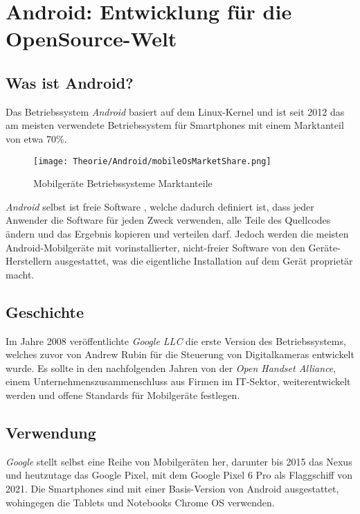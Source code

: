 \section{Android: Entwicklung für die OpenSource-Welt}
\label{android}

\subsection{Was ist Android?}
Das Betriebssystem \textit{Android} basiert auf dem Linux-Kernel und ist seit 2012 das am meisten
verwendete Betriebssystem für Smartphones mit einem Marktanteil von etwa 70\%.

\begin{figure}[H]
  \begin{center}
    \texttt{[image: Theorie/Android/mobileOsMarketShare.png]}
    \caption{Mobilgeräte Betriebssysteme Marktanteile \cite{mobileOsMarketShare}}
  \end{center}
\end{figure}

\textit{Android} selbst ist freie Software \cite{androidOpenSourceProject}, welche dadurch definiert
ist, dass jeder Anwender die Software für jeden Zweck verwenden, alle Teile des Quellcodes
ändern und das Ergebnis kopieren und verteilen darf. Jedoch werden die meisten Android-Mobilgeräte
mit vorinstallierter, nicht-freier Software von den Geräte-Herstellern ausgestattet, was die
eigentliche Installation auf dem Gerät proprietär macht.

\subsection{Geschichte}
Im Jahre 2008 veröffentlichte \textit{Google LLC} die erste Version des Betriebssystems, welches
zuvor von Andrew Rubin für die Steuerung von Digitalkameras entwickelt wurde. Es sollte in den
nachfolgenden Jahren von der \textit{Open Handset Alliance}, einem Unternehmenszusammenschluss
aus Firmen im IT-Sektor, weiterentwickelt werden und offene Standards für Mobilgeräte festlegen.

\subsection{Verwendung}
\textit{Google} stellt selbst eine Reihe von Mobilgeräten her, darunter bis 2015 das Nexus und
heutzutage das Google Pixel, mit dem Google Pixel 6 Pro als Flaggschiff von 2021. Die Smartphones
sind mit einer Basis-Version von Android ausgestattet, wohingegen die Tablets und Notebooks Chrome
OS verwenden.

